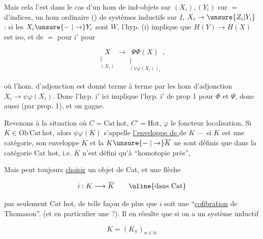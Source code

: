 Mais cela l'est dans le cas d'un hom de ind-objets sur  $(X_i),(Y_i)$ sur  $=$  d'indices,    un  hom ordinaire () de  systèmes inductifs sur $I$, $X_i\to\unsure{Z_i|Y_i}$ :  si les $X_i\unsure{\relbar|\to}Y_i$ sont  $W$, l'hyp. (i) implique que $H(Y)\to H(X)$ est iso, et de $=$ pour i$'$ pour

\[
 \underset{\substack{\Vert\\(X_i)}}{X}\longrightarrow
 \underset{\substack{\Vert\\(\psi\varphi(X_i))_i}}{\Psi\Phi(X)} ,
\]

où l'hom. d'adjonction est donné terme à terme par les hom d'adjonction $X_i\longrightarrow\psi\varphi(X_i)$. Donc l'hyp. i$'$  ici implique l'hyp. i$'$ de prop 1 pour $\Phi$ et $\Psi$, donc aussi  (par prop. 1), et on gagne.


Revenons à la situation où $C=\mathrm{Cat\,hot}$, $C'=\mathrm{Hot}$, $\varphi$ le foncteur localisation. Si $K\in\mathrm{Ob}\,\mathrm{Cat\,hot}$, alors $\psi\varphi(K)$ s'appelle \uline{l'enveloppe de } de $K$ --- si $K$ est une catégorie, son enveloppe $\overline K$  et la  $K\unsure{\relbar|\to}\overline K$ ne sont définis que dans la catégorie Cat hot, i.e. $\overline K$ n'est défini qu'à ``homotopie près'',


Mais  peut toujours \uline{choisir}  un  objet  de Cat, et une flèche

\[
 i:K\longrightarrow\overline K\qquad\text{\uline{dans Cat}}
\]

pas seulement  Cat hot, de telle façon de plus que $i$ soit une ``\uline{cofibration} de Thomason''. (et en particulier une  ?). Il  en résulte que si on a un système inductif

\[
 K=(K_n)_{n\in\mathbb N}
\]

